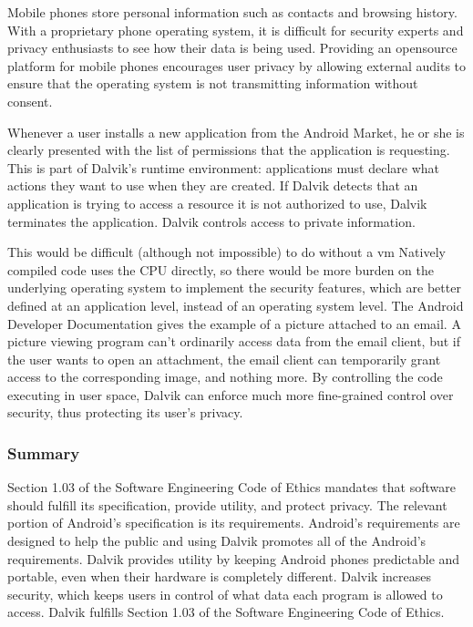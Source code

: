 \documentclass[11pt]{article}
\begin{document}
\begin{multicols}{2}
Mobile phones store personal information such as contacts and browsing history.
With a proprietary phone operating system, it is difficult for security experts
and privacy enthusiasts to see how their data is being used.  Providing an
\gls{opensource} platform for mobile phones encourages user privacy by allowing
external audits to ensure that the operating system is not transmitting
information without consent.

Whenever a user installs a new application from the Android Market, he or she is
clearly presented with the list of permissions that the application is
requesting.  This is part of Dalvik's runtime environment: applications must
declare what actions they want to use when they are created.  If Dalvik detects
that an application is trying to access a resource it is not authorized to use,
Dalvik terminates the application.  Dalvik controls access to private
information.

This would be difficult (although not impossible) to do without a \gls{vm}
Natively compiled code uses the CPU directly, so there would be more burden on
the underlying operating system to implement the security features, which are
better defined at an application level, instead of an operating system level.
The Android Developer Documentation gives the example of a picture attached to
an email. \cite[URI Permissions]{android-dev-security}  A picture viewing
program can't ordinarily access data from the email client, but if the user
wants to open an attachment, the email client can temporarily grant access to
the corresponding image, and nothing more.  By controlling the code executing in
user space, Dalvik can enforce much more fine-grained control over security,
thus protecting its user's privacy.


\subsubsection{Summary} %
\label{ssub:public-summary}

Section 1.03 of the Software Engineering Code of Ethics mandates that software
should fulfill its specification, provide utility, and protect privacy.  The
relevant portion of Android's specification is its requirements.  Android's
requirements are designed to help the public and using Dalvik promotes all of
the Android's requirements.  Dalvik provides utility by keeping Android phones
predictable and portable, even when their hardware is completely different.
Dalvik increases security, which keeps users in control of what data each
program is allowed to access.  Dalvik fulfills Section 1.03 of the Software
Engineering Code of Ethics.


\end{multicols}
\end{document}
